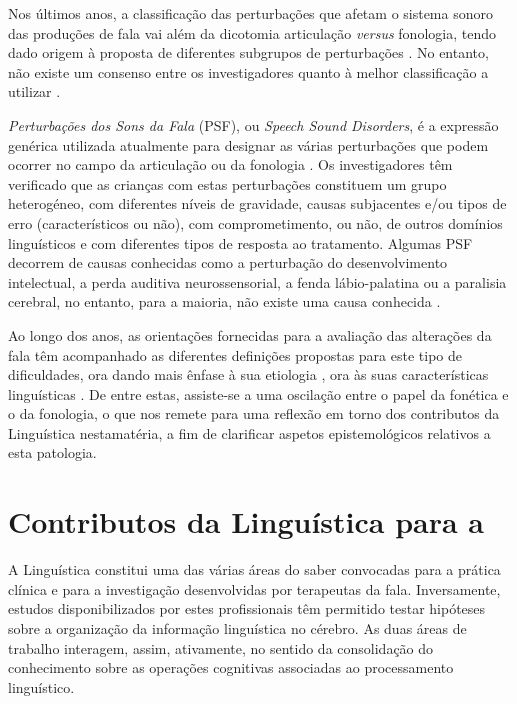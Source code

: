 \documentclass[output=paper]{LSP/langsci}
\begin{document}
Nos últimos anos, a classificação das perturbações que afetam o sistema sonoro das produções de fala vai além da dicotomia articulação \textit{versus} fonologia, tendo dado origem à proposta de diferentes subgrupos de perturbações \citep{dodd2005understanding,shriberg_etal2010,stackhousewells1997}. No entanto, não existe um consenso entre os investigadores quanto à melhor classificação a utilizar \citep{waringknight2013}. 

\textit{Perturbações dos Sons da Fala} (PSF), ou \textit{Speech Sound Disorders}, é a expressão genérica utilizada atualmente para designar as várias perturbações que podem ocorrer no campo da articulação ou da fonologia \citep{apa2013}. Os investigadores têm verificado que as crianças com estas perturbações constituem um grupo heterogéneo, com diferentes níveis de gravidade, causas subjacentes e/ou tipos de erro (característicos ou não), com comprometimento, ou não, de outros domínios linguísticos e com diferentes tipos de resposta ao tratamento. Algumas PSF decorrem de causas conhecidas como a perturbação do desenvolvimento intelectual, a perda auditiva neurossensorial, a fenda lábio-palatina ou a paralisia cerebral, no entanto, para a maioria, não existe uma causa conhecida \citep{waringknight2013}.

Ao longo dos anos, as orientações fornecidas para a avaliação das alterações da fala têm acompanhado as diferentes definições propostas para este tipo de dificuldades, ora dando mais ênfase à sua etiologia \citep{shriberg_etal2010}, ora às suas características linguísticas \citep{broomfielddodd2004}. De entre estas, assiste-se a uma oscilação entre o papel da fonética e o da fonologia, o que nos remete para uma reflexão em torno dos contributos da Linguística nesta\largerpage matéria, a fim de clarificar aspetos epistemológicos relativos a esta patologia.

\section{Contributos da Linguística para a }
\label{sec:lousada_contributos}

A Linguística constitui uma das várias áreas do saber convocadas para a prática clínica e para a investigação desenvolvidas por terapeutas da fala. Inversamente, estudos disponibilizados por estes profissionais têm permitido testar hipóteses sobre a organização da informação linguística no cérebro. As duas áreas de trabalho interagem, assim, ativamente, no sentido da consolidação do conhecimento sobre as operações cognitivas associadas ao processamento linguístico.
\end{document}
